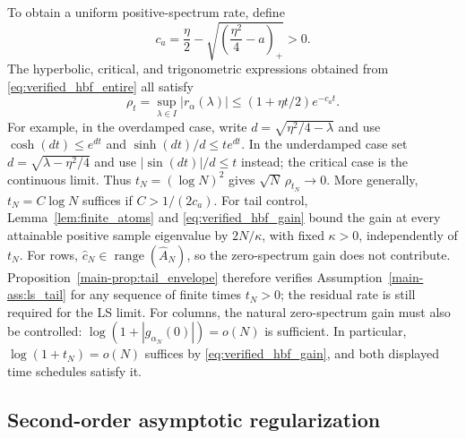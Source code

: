 \documentclass[11pt,a4paper,leqno]{article}
\numberwithin{equation}{section}
\numberwithin{figure}{section}
\numberwithin{table}{section}
\theoremstyle{plain}
\theoremstyle{definition}
\theoremstyle{remark}
\begin{document}
To obtain a uniform positive-spectrum rate, define
\[
 c_a=\frac{\eta}{2}
       -\sqrt{\left(\frac{\eta^2}{4}-a\right)_+}>0.
\]
The hyperbolic, critical, and trigonometric expressions obtained from
\eqref{eq:verified_hbf_entire} all satisfy
\begin{equation*}
 \rho_t=\sup_{\lambda\in I}|r_\alpha(\lambda)|
       \leq(1+\eta t/2)e^{-c_at}.
\end{equation*}
For example, in the overdamped case, write
$d=\sqrt{\eta^2/4-\lambda}$ and use
$\cosh(dt)\leq e^{dt}$ and $\sinh(dt)/d\leq te^{dt}$.
In the underdamped case set $d=\sqrt{\lambda-\eta^2/4}$ and use
$|\sin(dt)|/d\leq t$ instead;
the critical case is the continuous limit.
Thus $t_N=(\log N)^2$ gives $\sqrt N\,\rho_{t_N}\to0$.
More generally, $t_N=C\log N$ suffices if $C>1/(2c_a)$.
For tail control, Lemma~\ref{lem:finite_atoms} and
\eqref{eq:verified_hbf_gain} bound the gain at every attainable positive
sample eigenvalue by $2N/\kappa$, with fixed $\kappa>0$, independently of $t_N$.
For rows, $\widehat c_N\in\operatorname{range}(\widehat A_N)$, so the
zero-spectrum gain does not contribute. Proposition~\ref{main-prop:tail_envelope}
therefore verifies Assumption~\ref{main-ass:ls_tail} for any sequence of finite
times $t_N>0$; the residual rate is still required for the LS limit.
For columns, the natural zero-spectrum gain must also be controlled:
$\log(1+|g_{\alpha_N}(0)|)=o(N)$ is sufficient.
In particular, $\log(1+t_N)=o(N)$ suffices by
\eqref{eq:verified_hbf_gain}, and both displayed time schedules satisfy it.

\subsection{Second-order asymptotic regularization}
\end{document}
